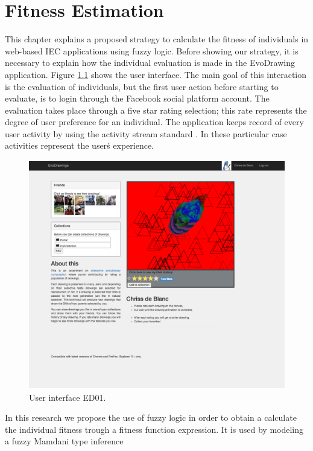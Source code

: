 \chapter{Fitness Estimation}

This chapter explains a proposed strategy to calculate the fitness of
individuals in web-based IEC applications
using fuzzy logic. Before showing our strategy, it is necessary to explain how
the individual evaluation is made in the EvoDrawing application. Figure
\ref{fig:UI_ED} shows the user interface.
The main goal of this interaction is the evaluation of individuals, but
the first user action before starting to evaluate, is to login through the
Facebook \cite{facebook} social
platform account. The evaluation takes place through a
five star rating selection; this rate represents the degree of user
preference for an individual. The application keeps record of every user
activity by using the activity stream standard \cite{snell2014json}.
In these particular case activities represent the user\'s experience.

\begin{figure}
\captionsetup{justification=centering,margin=2cm}
\centering
\setlength\fboxsep{0pt}
\setlength\fboxrule{0.7pt}
\includegraphics[width=12cm,height=10cm,keepaspectratio]{img/UI_ed01.png}
\caption{User interface ED01.}
\label{fig:UI_ED}
\end{figure}

In this research we propose the use of fuzzy logic \cite{Zadeh1973} in order to
obtain a calculate the individual fitness trough a fitness function expression. It is
used by modeling a fuzzy Mamdani type inference

